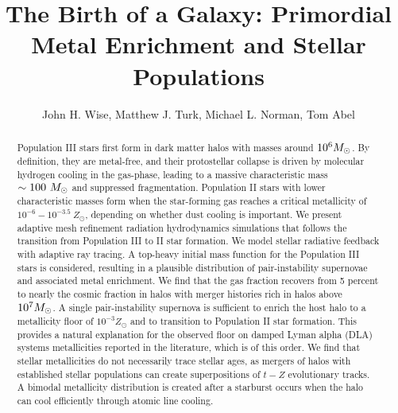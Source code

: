 \documentclass[apjl]{emulateapj}
\begin{document}

\title{The Birth of a Galaxy: Primordial Metal Enrichment and Stellar
  Populations}

\author{John H. Wise, 
  Matthew J. Turk,
  Michael L. Norman,
  Tom Abel}



\begin{abstract}

  Population III stars first form in dark matter halos with masses
  around $10^6 \Ms$.  By definition, they are metal-free, and their
  protostellar collapse is driven by molecular hydrogen cooling in the
  gas-phase, leading to a massive characteristic mass $\sim 100~\Ms$
  and suppressed fragmentation.  Population II stars with lower
  characteristic masses form when the star-forming gas reaches a
  critical metallicity of $10^{-6} - 10^{-3.5}~Z_\odot$, depending on
  whether dust cooling is important.  We present adaptive mesh
  refinement radiation hydrodynamics simulations that follows the
  transition from Population III to II star formation.  We model
  stellar radiative feedback with adaptive ray tracing.  A top-heavy
  initial mass function for the Population III stars is considered,
  resulting in a plausible distribution of pair-instability supernovae
  and associated metal enrichment.  We find that the gas fraction
  recovers from 5 percent to nearly the cosmic fraction in halos with
  merger histories rich in halos above $10^7 \Ms$.  A single
  pair-instability supernova is sufficient to enrich the host halo to
  a metallicity floor of $10^{-3} Z_\odot$ and to transition to
  Population II star formation.  This provides a natural explanation
  for the observed floor on damped Lyman alpha (DLA) systems
  metallicities reported in the literature, which is of this order.
  We find that stellar metallicities do not necessarily trace stellar
  ages, as mergers of halos with established stellar populations can
  create superpositions of $t-Z$ evolutionary tracks.  A bimodal
  metallicity distribution is created after a starburst occurs when
  the halo can cool efficiently through atomic line cooling.

\end{abstract}
\end{document}
